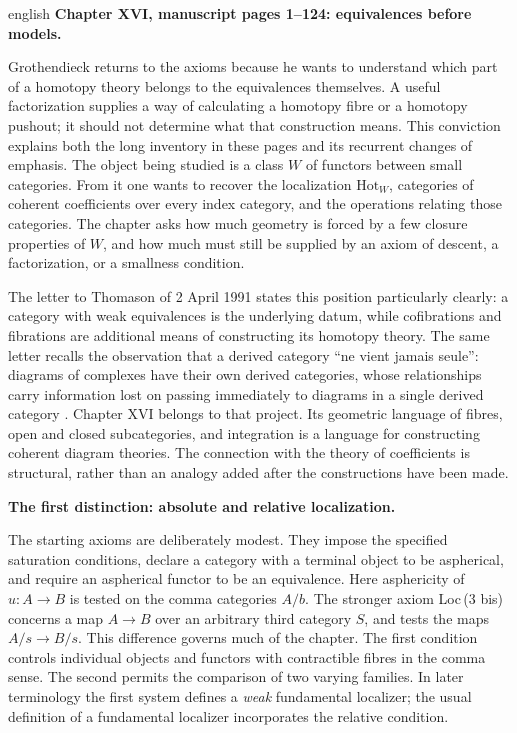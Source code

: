 \begin{otherlanguage*}{english}
\noindent\textbf{Chapter XVI, manuscript pages 1--124: equivalences before models.}

Grothendieck returns to the axioms because he wants to understand which part of a homotopy theory belongs to the equivalences themselves. A useful factorization supplies a way of calculating a homotopy fibre or a homotopy pushout; it should not determine what that construction means. This conviction explains both the long inventory in these pages and its recurrent changes of emphasis. The object being studied is a class $W$ of functors between small categories. From it one wants to recover the localization $\mathrm{Hot}_W$, categories of coherent coefficients over every index category, and the operations relating those categories. The chapter asks how much geometry is forced by a few closure properties of $W$, and how much must still be supplied by an axiom of descent, a factorization, or a smallness condition.

The letter to Thomason of 2 April 1991 states this position particularly clearly: a category with weak equivalences is the underlying datum, while cofibrations and fibrations are additional means of constructing its homotopy theory. The same letter recalls the observation that a derived category ``ne vient jamais seule'': diagrams of complexes have their own derived categories, whose relationships carry information lost on passing immediately to diagrams in a single derived category \citep[\S\S1--2]{Grothendieck1991Letter}. Chapter XVI belongs to that project. Its geometric language of fibres, open and closed subcategories, and integration is a language for constructing coherent diagram theories. The connection with the theory of coefficients is structural, rather than an analogy added after the constructions have been made.

\medskip\noindent\textbf{The first distinction: absolute and relative localization.}

The starting axioms are deliberately modest. They impose the specified saturation conditions, declare a category with a terminal object to be aspherical, and require an aspherical functor to be an equivalence. Here asphericity of $u:A\to B$ is tested on the comma categories $A/b$. The stronger axiom Loc\,(3 bis) concerns a map $A\to B$ over an arbitrary third category $S$, and tests the maps $A/s\to B/s$. This difference governs much of the chapter. The first condition controls individual objects and functors with contractible fibres in the comma sense. The second permits the comparison of two varying families. In later terminology the first system defines a \emph{weak} fundamental localizer; the usual definition of a fundamental localizer incorporates the relative condition.


\end{otherlanguage*}
